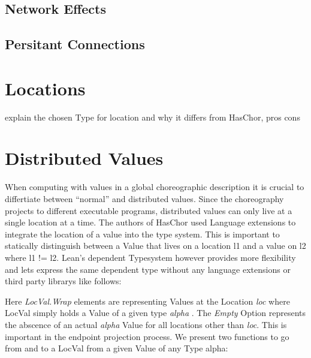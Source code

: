 \subsection{Network Effects}


\subsection{Persitant Connections}



\section{Locations}

explain the chosen Type for location and why it differs from HasChor, pros cons

\section{Distributed Values}
When computing with values in a global choreographic description it is crucial to differtiate between ``normal'' and distributed values. Since the choreography projects to different executable programs, distributed values can only live at a single location at a time. The authors of HasChor used Language extensions to integrate the location of a value into the type system. This is important to statically distinguish between a Value that lives on a location l1 and a value on l2 where l1 != l2.
Lean's dependent Typesystem however provides more flexibility and lets express the same dependent type without any language extensions or third party librarys like follows:


Here \emph{LocVal.Wrap} elements are representing Values at the Location \emph{loc} where LocVal simply holds a Value of a given type \emph{ alpha }.
The \emph{Empty} Option represents the abscence of an actual \emph{alpha} Value for all locations other than \emph{loc}. This is important in the endpoint projection process. We present two functions to go from and to a LocVal from a given Value of any Type alpha:



